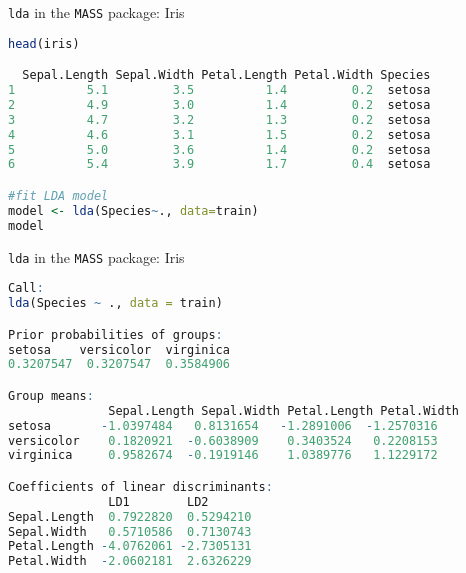 \documentclass{beamer}
\begin{document}
\begin{frame}[fragile]{\texttt{lda} in the \texttt{MASS} package: Iris}
	\begin{lstlisting}[language=R, basicstyle=\scriptsize]
head(iris)

  Sepal.Length Sepal.Width Petal.Length Petal.Width Species
1          5.1         3.5          1.4         0.2  setosa
2          4.9         3.0          1.4         0.2  setosa
3          4.7         3.2          1.3         0.2  setosa
4          4.6         3.1          1.5         0.2  setosa
5          5.0         3.6          1.4         0.2  setosa
6          5.4         3.9          1.7         0.4  setosa

#fit LDA model
model <- lda(Species~., data=train)
model
\end{lstlisting}
\end{frame}

\begin{frame}[fragile]{\texttt{lda} in the \texttt{MASS} package: Iris}
	\begin{lstlisting}[language=R, basicstyle=\scriptsize]
Call:
lda(Species ~ ., data = train)

Prior probabilities of groups:
setosa    versicolor  virginica 
0.3207547  0.3207547  0.3584906 

Group means:
              Sepal.Length Sepal.Width Petal.Length Petal.Width
setosa       -1.0397484   0.8131654   -1.2891006  -1.2570316
versicolor    0.1820921  -0.6038909    0.3403524   0.2208153
virginica     0.9582674  -0.1919146    1.0389776   1.1229172

Coefficients of linear discriminants:
              LD1        LD2
Sepal.Length  0.7922820  0.5294210
Sepal.Width   0.5710586  0.7130743
Petal.Length -4.0762061 -2.7305131
Petal.Width  -2.0602181  2.6326229

\end{lstlisting}
\end{frame}






\end{document}
